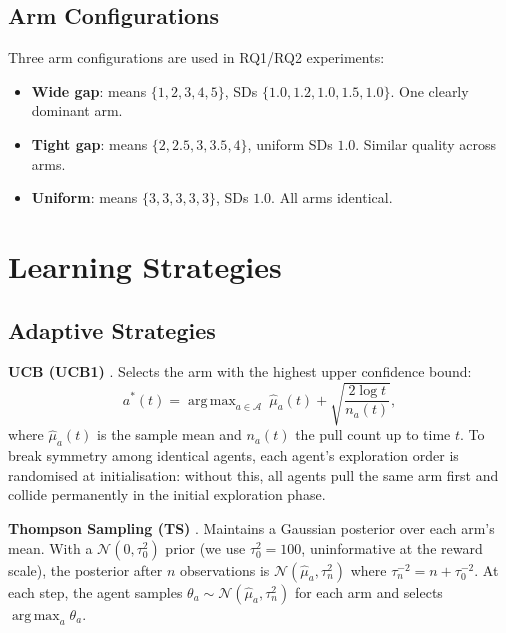 \documentclass[11pt]{article}
\DeclareMathOperator*{\argmax}{arg\,max}
\begin{document}
\subsection{Arm Configurations}

Three arm configurations are used in RQ1/RQ2 experiments:

\begin{itemize}
\item \textbf{Wide gap}: means $\{1, 2, 3, 4, 5\}$, SDs $\{1.0, 1.2, 1.0, 1.5, 1.0\}$. One clearly dominant arm.
\item \textbf{Tight gap}: means $\{2, 2.5, 3, 3.5, 4\}$, uniform SDs $1.0$. Similar quality across arms.
\item \textbf{Uniform}: means $\{3, 3, 3, 3, 3\}$, SDs $1.0$. All arms identical.
\end{itemize}

\section{Learning Strategies}
\label{sec:strategies}

\subsection{Adaptive Strategies}

\textbf{UCB (UCB1)} \citep{auer2002}.
Selects the arm with the highest upper confidence bound:
\begin{equation}
  a^*(t) = \argmax_{a \in \mathcal{A}}\ \hat{\mu}_a(t) + \sqrt{\frac{2 \log t}{n_a(t)}},
\end{equation}
where $\hat{\mu}_a(t)$ is the sample mean and $n_a(t)$ the pull count up
to time $t$.
To break symmetry among identical agents, each agent's exploration order
is randomised at initialisation: without this, all agents pull the same
arm first and collide permanently in the initial exploration phase.

\textbf{Thompson Sampling (TS)} \citep{thompson1933}.
Maintains a Gaussian posterior over each arm's mean. With a
$\mathcal{N}(0, \tau_0^2)$ prior (we use $\tau_0^2 = 100$, uninformative
at the reward scale), the posterior after $n$ observations is
$\mathcal{N}(\hat{\mu}_a, \tau_n^2)$ where
$\tau_n^{-2} = n + \tau_0^{-2}$.
At each step, the agent samples $\theta_a \sim \mathcal{N}(\hat{\mu}_a, \tau_n^2)$
for each arm and selects $\argmax_a \theta_a$.
\end{document}
